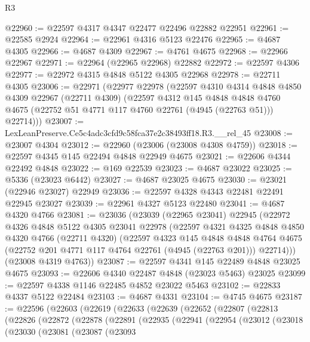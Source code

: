 \begin{lexlean}{R3}
\begin{coremodule}
@22960 := @22597 @4317 @4347 @22477 @22496 @22882 @22951
@22961 := @22585 @2924
@22964 := @22961 @4316 @5123 @22476
@22965 := @4687 @4305
@22966 := @4687 @4309
@22967 := @4761 @4675
@22968 := @22966 @22967
@22971 := @22964 (@22965 @22968) @22882
@22972 := @22597 @4306
@22977 := @22972 @4315 @4848 @5122 @4305 @22968
@22978 := @22711 @4305
@23006 := @22971
    (@22977
      @22978
      (@22597
        @4310
        @4314
        @4848
        @4850
        @4309
        @22967
        (@22711 @4309)
        (@22597
          @4312
          @145
          @4848
          @4848
          @4760
          @4675
          (@22752 @51 @4771 @117 @4760 @22761 (@4945 (@22763 @51)))
          @22714)))
@23007 := LexLeanPreserve.Ce5c4adc3cfd9c58fca37e2c38493ff18.R3.__rel_45
@23008 := @23007 @4304
@23012 := @22960 (@23006 (@23008 @4308 @4759))
@23018 := @22597 @4345 @145 @22494 @4848 @22949 @4675
@23021 := @22606 @4344 @22492 @4848
@23022 := @169 @22539
@23023 := @4687 @23022
@23025 := @5336 (@23023 @6442)
@23027 := @4687 @23025 @4675
@23030 := @23021 (@22946 @23027) @22949
@23036 := @22597 @4328 @4343 @22481 @22491 @22945 @23027
@23039 := @22961 @4327 @5123 @22480
@23041 := @4687 @4320 @4766
@23081 := @23036
    (@23039
      (@22965 @23041)
      @22945
      (@22972
        @4326
        @4848
        @5122
        @4305
        @23041
        @22978
        (@22597
          @4321
          @4325
          @4848
          @4850
          @4320
          @4766
          (@22711 @4320)
          (@22597
            @4323
            @145
            @4848
            @4848
            @4764
            @4675
            (@22752 @201 @4771 @117 @4764 @22761 (@4945 (@22763 @201)))
            @22714)))
      (@23008 @4319 @4763))
@23087 := @22597 @4341 @145 @22489 @4848 @23025 @4675
@23093 := @22606 @4340 @22487 @4848 (@23023 @5463) @23025
@23099 := @22597 @4338 @1146 @22485 @4852 @23022 @5463
@23102 := @22833 @4337 @5122 @22484
@23103 := @4687 @4331
@23104 := @4745 @4675
@23187 := @22596
    (@22603
      (@22619
        (@22633
          (@22639
            (@22652
              (@22807
                (@22813
                  (@22826
                    (@22872
                      (@22878
                        (@22891
                          (@22935
                            (@22941
                              (@22954
                                (@23012
                                  (@23018
                                    (@23030
                                      (@23081
                                        (@23087
                                          (@23093

\end{coremodule}
\end{lexlean}
